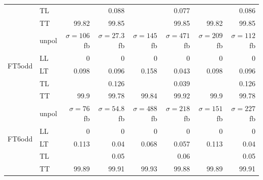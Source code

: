 \begin{table}[h]
{\begin{tabular}{llrrrrrr}
 & TL &  & \num{0.088} &  & \num{0.077} &  & \num{0.086} \\
 & TT & \num{99.82} & \num{99.85} &  & \num{99.85} & \num{99.82} & \num{99.85} \\
\midrule
\multirow{5}{*}{FT5odd}
 & unpol & $\sigma = \num{106}$ fb & $\sigma = \num{27.3}$ fb & $\sigma = \num{145}$ fb & $\sigma = \num{471}$ fb & $\sigma = \num{209}$ fb & $\sigma = \num{112}$ fb \\
 & LL & \num{0} & \num{0} & \num{0} & \num{0} & \num{0} & \num{0} \\
 & LT & \num{0.098} & \num{0.096} & \num{0.158} & \num{0.043} & \num{0.098} & \num{0.096} \\
 & TL &  & \num{0.126} &  & \num{0.039} &  & \num{0.126} \\
 & TT & \num{99.9} & \num{99.78} & \num{99.84} & \num{99.92} & \num{99.9} & \num{99.78} \\
\midrule
\multirow{5}{*}{FT6odd}
 & unpol & $\sigma = \num{76}$ fb & $\sigma = \num{54.8}$ fb & $\sigma = \num{488}$ fb & $\sigma = \num{218}$ fb & $\sigma = \num{151}$ fb & $\sigma = \num{227}$ fb \\
 & LL & \num{0} & \num{0} & \num{0} & \num{0} & \num{0} & \num{0} \\
 & LT & \num{0.113} & \num{0.04} & \num{0.068} & \num{0.057} & \num{0.113} & \num{0.04} \\
 & TL &  & \num{0.05} &  & \num{0.06} &  & \num{0.05} \\
 & TT & \num{99.89} & \num{99.91} & \num{99.93} & \num{99.88} & \num{99.89} & \num{99.91} \\
\bottomrule
\end{tabular}
}%
\end{table}